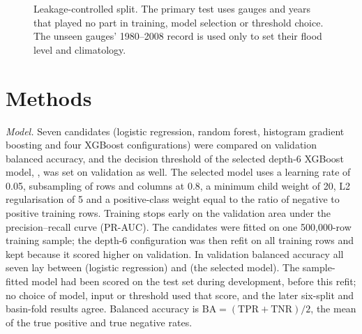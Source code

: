 \documentclass[conference]{IEEEtran}
\begin{document}
\begin{figure}[t]
\centering
{}
\caption{Leakage-controlled split. The primary test uses gauges and years that played no part in training, model selection or threshold choice. The unseen gauges' 1980--2008 record is used only to set their flood level and climatology.}
\label{fig:split}
\end{figure}

\section{Methods}
\textit{Model.} Seven candidates (logistic regression, random forest, histogram gradient boosting and four XGBoost \cite{Chen2016} configurations) were compared on validation balanced accuracy, and the decision threshold of the selected depth-6 XGBoost model, \Thr, was set on validation as well. The selected model uses a learning rate of 0.05, subsampling of rows and columns at 0.8, a minimum child weight of 20, L2 regularisation of 5 and a positive-class weight equal to the ratio of negative to positive training rows. Training stops early on the validation area under the precision--recall curve (PR-AUC). The candidates were fitted on one 500,000-row training sample; the depth-6 configuration was then refit on all training rows and kept because it scored higher on validation. In validation balanced accuracy all seven lay between \CandLrBA{} (logistic regression) and \CandSelBA{} (the selected model). The sample-fitted model had been scored on the test set during development, before this refit; no choice of model, input or threshold used that score, and the later six-split and basin-fold results agree. Balanced accuracy is $\mathrm{BA}=(\mathrm{TPR}+\mathrm{TNR})/2$, the mean of the true positive and true negative rates.
\end{document}
